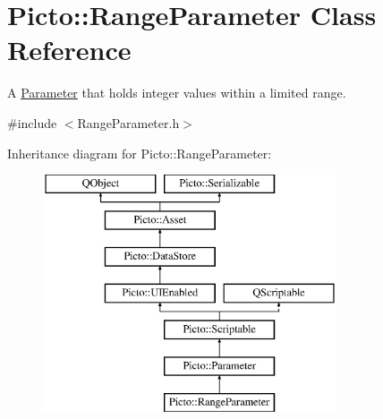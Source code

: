 \hypertarget{class_picto_1_1_range_parameter}{\section{Picto\-:\-:Range\-Parameter Class Reference}
\label{class_picto_1_1_range_parameter}
}


A \hyperlink{class_picto_1_1_parameter}{Parameter} that holds integer values within a limited range.  




{\ttfamily \#include $<$Range\-Parameter.\-h$>$}

Inheritance diagram for Picto\-:\-:Range\-Parameter\-:\begin{figure}[H]
\begin{center}
\leavevmode
\includegraphics[height=7.000000cm]{class_picto_1_1_range_parameter}
\end{center}
\end{figure}
